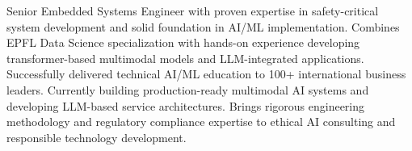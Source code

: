 %
%
%


\vspace*{-3mm}\par{
Senior Embedded Systems Engineer with proven expertise in safety-critical system development and solid foundation in AI/ML implementation. Combines EPFL Data Science specialization with hands-on experience developing transformer-based multimodal models and LLM-integrated applications. Successfully delivered technical AI/ML education to 100+ international business leaders. Currently building production-ready multimodal AI systems and developing LLM-based service architectures. Brings rigorous engineering methodology and regulatory compliance expertise to ethical AI consulting and responsible technology development.
}
